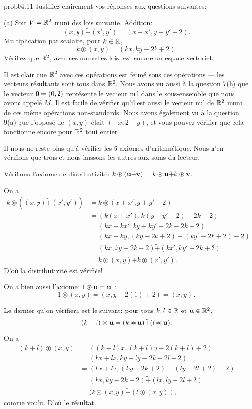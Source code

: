 \bigskip
\begin{sol}{prob04.11} Justifiez clairement vos
réponses aux questions suivantes:

\medskip
(a) Soit $V=\mathbb{R}^2$ muni des lois suivante. Addition:
  \[(x,y) \tilde+ (x',y')=(x+x', y+y'-2).\] Multiplication
  par scalaire, pour $k\in \mathbb{R}$, \[k\circledast (x,y)=(kx, ky-2k+2).\]
  Vérifiez que $\mathbb{R}^2$, avec ces nouvelles lois, est encore un
  espace vectoriel.

\soln Il est clair que $\mathbb{R}^2$ avec ces opérations est fermé sous ces
opérations --- les vecteurs r\'esultants sont tous dans $\mathbb{R}^2$. Nous avons vu aussi à la question 7(h) que le vecteur $\tilde {\mathbf{0}}=(0,2)$
représente le vecteur nul dans le sous-ensemble que nous avons appelé
$M$. Il est facile de vérifier qu'il est aussi le vecteur nul de $\mathbb{R}^2$ muni de ces même opérations non-standards.
Nous avons également vu à la question 9(a) que l'oppos\'e de $(x,y)$ était
$(-x, 2-y)$, et vous pouvez vérifier que cela fonctionne encore pour
$\mathbb{R}^2$ tout entier.

Il nous ne reste plus qu'à vérifier les 6 axiomes d'arithmétique. Nous n'en vérifions que trois et nous laissons les autres aux soins du lecteur. 

Vérifions l'axiome de distributivit\'e:
$k\circledast (\mathbf{u} \tilde+ \mathbf{v})  = k\circledast \mathbf{u} \tilde+ k\circledast \mathbf{v}$.

On a \[\begin{aligned}
k\circledast ((x,y) \tilde+ (x',y'))  &=k\circledast(x+x', y+y'-2)\\
&=(k(x+x'), k(y+y'-2)-2k+2)\\ 
&=(kx+ k x', ky+ky'-2k-2k+2)\\
&=(kx +ky, (ky -2k +2)+ (ky' -2k +2)-2)\\
&=(kx, ky -2k +2) \tilde+(kx', ky' -2k +2)\\
&=k\circledast (x,y) \tilde+ k\circledast (x',y')\,.\end{aligned}\] 
D'où la distributivit\'e est v\'erifi\'ee!

On a bien aussi l'axiome: $1\circledast \mathbf{u}=\mathbf{u}$ :
$$1\circledast (x,y)=(x, y -2(1) +2)=(x,y)\,.$$

Le dernier qu'on vérifiera est le suivant: pour tous $k,l\in \mathbb{R}$ et $\mathbf{u}\in \mathbb{R}^2$,
\[(k+l)\circledast \mathbf{u}= (k\circledast \mathbf{u})\tilde+ (l \circledast \mathbf{u}).\]

On a  \[\begin{aligned}
 (k+l)\circledast (x,y)  &=((k+l)x, (k+l)y -2(k+l)+2)\\
&=(kx+ lx , ky+ly-2k-2l+2)\\ 
&= (kx +lx,(ky-2k+2)+(ly-2l+2)-2)\\ 
&= (kx, ky-2k+2)\tilde+ (lx, ly-2l+2)\\
&= (k\circledast (x,y)\tilde+ (l \circledast (x,y)),\end{aligned}\]
comme voulu. D'où le résultat.
\end{sol}

